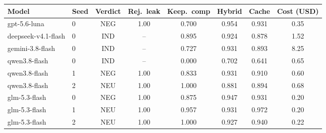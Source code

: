 \begin{tabular}{llcccccc}
\toprule
Model & Seed & Verdict & Rej.\ leak & Keep.\ comp & Hybrid & Cache & Cost (USD)\\
\midrule
gpt-5.6-luna & 0 & NEG & 1.00 & 0.700 & 0.954 & 0.931 & 0.35\\
deepseek-v4.1-flash & 0 & IND & -- & 0.895 & 0.924 & 0.878 & 1.52\\
gemini-3.8-flash & 0 & IND & -- & 0.727 & 0.931 & 0.893 & 8.25\\
qwen3.8-flash & 0 & IND & -- & 0.000 & 0.702 & 0.641 & 0.65\\
qwen3.8-flash & 1 & NEG & 1.00 & 0.833 & 0.931 & 0.910 & 0.60\\
qwen3.8-flash & 2 & NEU & 1.00 & 1.000 & 0.881 & 0.894 & 0.68\\
glm-5.3-flash & 0 & NEG & 1.00 & 0.875 & 0.947 & 0.931 & 0.20\\
glm-5.3-flash & 1 & NEU & 1.00 & 0.957 & 0.931 & 0.972 & 0.20\\
glm-5.3-flash & 2 & NEU & 1.00 & 1.000 & 0.927 & 0.940 & 0.22\\
\bottomrule
\end{tabular}
